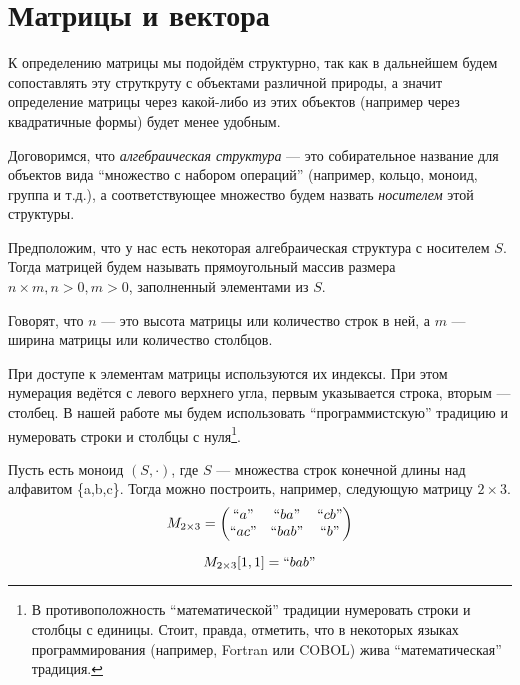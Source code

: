 \section{Матрицы и вектора}

К определению матрицы мы подойдём структурно, так как в дальнейшем будем сопоставлять эту струткруту с объектами различной природы, а значит определение матрицы через какой-либо из этих объектов (например через квадратичные формы) будет менее удобным.

Договоримся, что \textit{алгебраическая структура} --- это собирательное название для объектов вида ``множество с набором операций'' (например, кольцо, моноид, группа и т.д.), а соответствующее множество будем назвать \textit{носителем} этой структуры.

\begin{definition}[Матрица]

Предположим, что у нас есть некоторая алгебраическая структура с носителем $S$. Тогда матрицей будем называть прямоугольный массив размера $n\times m, n > 0, m > 0$, заполненный элементами из $S$.

Говорят, что $n$ --- это высота матрицы или количество строк в ней, а $m$ --- ширина матрицы или количество столбцов.

\end{definition}

При доступе к элементам матрицы используются их индексы. При этом нумерация ведётся с левого верхнего угла, первым указывается строка, вторым --- столбец. В нашей работе мы будем использовать ``программистскую'' традицию и нумеровать строки и столбцы с нуля\footnote{В противоположность ``математической'' традиции нумеровать строки и столбцы с единицы. Стоит, правда, отметить, что в некоторых языках программирования (например, Fortran или COBOL) жива ``математическая'' традиция.}.

\begin{example}[Матрица]

Пусть есть моноид $(S,\cdot)$, где $S$ --- множества строк конечной длины над алфавитом \{a,b,c\}.
Тогда можно построить, например, следующую матрицу $2\times 3$.
$$
M_{2\times 3} = 
\begin{pmatrix}
``a" & ``ba" & ``cb" \\
``ac" & ``bab" & ``b" \\
\end{pmatrix}
$$

$$
M_{2\times 3}[1,1] = ``bab"
$$

\end{example}


